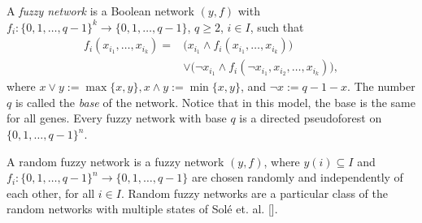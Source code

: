 \documentclass[letterpaper]{article}
\begin{document}
 A \emph{fuzzy network} is a Boolean network $(y,f)$ with $f_i\colon \{0,1,\dots,q-1\}^k\rightarrow \{0,1,\dots,q-1\}$, $q\geq 2$, $i\in I$, such that
 \begin{align*}
f_i(x_{i_1},\dots,x_{i_k})=& \big(x_{i_1}\wedge f_i(x_{i_1},\dots,x_{i_k})\big) \\
&\vee \big(\lnot x_{i_1} \wedge f_i(\lnot x_{i_1},x_{i_2},\dots,x_{i_k})\big),
  \end{align*}
  where $x\vee y:=\max\{x,y\}, x\wedge y:=\min\{x,y\}$, and $\lnot x:=q-1-x$.
  The number $q$ is called the \emph{base} of the network. 
Notice that in this model, the base  is the same for all genes.
Every fuzzy network with base $q$ is a directed pseudoforest on $\{0,1,\dots,q-1\}^n$. 

A random fuzzy network is a fuzzy network $(y,f)$, where   $y(i)\subseteq I$ and $f_i\colon\{0,1,\dots,q-1\}^n\rightarrow\{0,1,\dots,q-1\}$ are chosen randomly and  independently of each other, for all $i\in I$.
Random fuzzy networks are a particular class of the random networks with multiple states of Sol\'e et. al. []. 

 
\newpage
 
\section{}




\footnotesize
%
\end{document}
